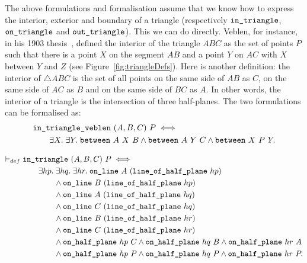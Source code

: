 The above formulations and formalisation assume that we know how to express the interior, exterior and boundary of a triangle (respectively $\texttt{in\_triangle}$, $\texttt{on\_triangle}$ and $\texttt{out\_triangle}$). This we can do directly. Veblen, for instance, in his 1903 thesis~\cite{Veblenphd}, defined the interior of the triangle $ABC$ as the set of points $P$ such that there is a point $X$ on the segment $AB$ and a point $Y$ on $AC$ with $X$ between $Y$ and $Z$ (see Figure~\ref{fig:triangleDefs}). Here is another definition: the interior of $\triangle ABC$ is the set of all points on the same side of $AB$ as $C$, on the same side of $AC$ as $B$ and on the same side of $BC$ as $A$. In other words, the interior of a triangle is the intersection of three half-planes. The two formulations can be formalised as:
\begin{equation*}
\begin{split}
  &\texttt{in\_triangle\_veblen}\ (A,B,C)\ P \iff\\
  &\qquad\exists X.\;\exists Y.\; \texttt{between}\ A\ X\ B \wedge \texttt{between}\ A\ Y\ C \wedge \texttt{between}\ X\ P\ Y.
\end{split}
\end{equation*}

\begin{equation}\label{eq:inTriangleDef}
\begin{split}
  \vdash_{def}\;&\code{in\_triangle}\ (A,B,C)\ P \iff\\
    &\qquad\exists hp.\;\exists hq.\;\exists hr.\;\code{on\_line}\ A\ (\code{line\_of\_half\_plane}\ hp)\\
    &\qquad\qquad\wedge \code{on\_line}\ B\ (\code{line\_of\_half\_plane}\  hp)\\
    &\qquad\qquad\wedge \code{on\_line}\ A\ (\code{line\_of\_half\_plane}\  hq)\\
    &\qquad\qquad\wedge \code{on\_line}\ C\ (\code{line\_of\_half\_plane}\  hq)\\
    &\qquad\qquad\wedge \code{on\_line}\ B\ (\code{line\_of\_half\_plane}\  hr)\\
    &\qquad\qquad\wedge \code{on\_line}\ C\ (\code{line\_of\_half\_plane}\  hr)\\
    &\qquad\qquad\wedge \code{on\_half\_plane}\ hp\ C \wedge \code{on\_half\_plane}\ hq\ B \wedge \code{on\_half\_plane}\ hr\ A\\
    &\qquad\qquad\wedge \code{on\_half\_plane}\ hp\ P \wedge \code{on\_half\_plane}\ hq\ P \wedge \code{on\_half\_plane}\ hr\ P.
\end{split}
\end{equation}

